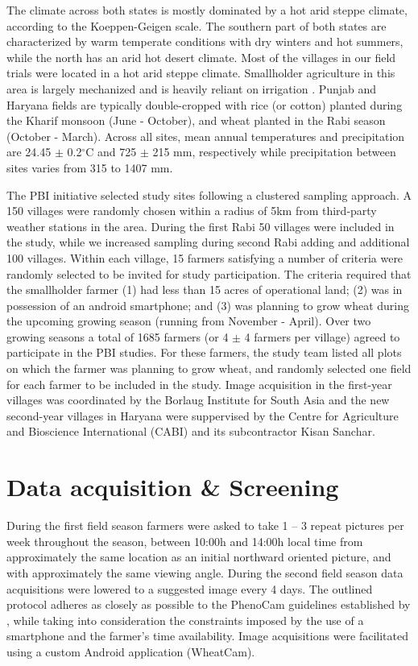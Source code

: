 \documentclass[, manuscript]{copernicus}
\begin{document}
The climate across both states is mostly dominated by a hot arid steppe
climate, according to the Koeppen-Geigen scale. The southern part of
both states are characterized by warm temperate conditions with dry
winters and hot summers, while the north has an arid hot desert climate.
Most of the villages in our field trials were located in a hot arid
steppe climate. Smallholder agriculture in this area is largely
mechanized and is heavily reliant on irrigation \citep{kumar2018}.
Punjab and Haryana fields are typically double-cropped with rice (or
cotton) planted during the Kharif monsoon (June - October), and wheat
planted in the Rabi season (October - March). Across all sites, mean
annual temperatures and precipitation are 24.45 \(\pm\) 0.2\(^\circ\)C
and 725 \(\pm\) 215 mm, respectively \citep{Hijmans2005} while
precipitation between sites varies from 315 to 1407 mm.

The PBI initiative selected study sites following a clustered sampling
approach. A 150 villages were randomly chosen within a radius of 5km
from third-party weather stations in the area. During the first Rabi 50
villages were included in the study, while we increased sampling during
second Rabi adding and additional 100 villages. Within each village, 15
farmers satisfying a number of criteria were randomly selected to be
invited for study participation. The criteria required
\citep{ceballos2019} that the smallholder farmer (1) had less than 15
acres of operational land; (2) was in possession of an android
smartphone; and (3) was planning to grow wheat during the upcoming
growing season (running from November - April). Over two growing seasons
a total of 1685 farmers (or 4 \(\pm\) 4 farmers per village) agreed to
participate in the PBI studies. For these farmers, the study team listed
all plots on which the farmer was planning to grow wheat, and randomly
selected one field for each farmer to be included in the study. Image
acquisition in the first-year villages was coordinated by the Borlaug
Institute for South Asia and the new second-year villages in Haryana
were suppervised by the Centre for Agriculture and Bioscience
International (CABI) and its subcontractor Kisan Sanchar.

\section{Data acquisition \& Screening}

During the first field season farmers were asked to take 1 -- 3 repeat
pictures per week throughout the season, between 10:00h and 14:00h local
time from approximately the same location as an initial northward
oriented picture, and with approximately the same viewing angle. During
the second field season data acquisitions were lowered to a suggested
image every 4 days. The outlined protocol adheres as closely as possible
to the PhenoCam guidelines established by \citet{Sonnentag2012}, while
taking into consideration the constraints imposed by the use of a
smartphone and the farmer's time availability. Image acquisitions were
facilitated using a custom Android application (WheatCam).
\end{document}
